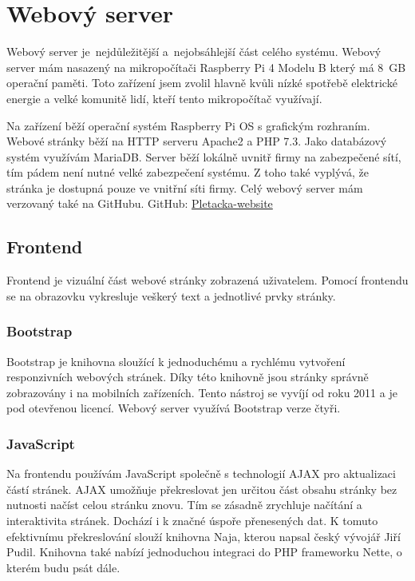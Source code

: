 \chapter{Webový server}
Webový server je~nejdůležitější a~nejobsáhlejší část celého systému. 
Webový server mám nasazený na mikropočítači Raspberry Pi 4 Modelu B který má 8~GB operační paměti.
Toto zařízení jsem zvolil hlavně kvůli nízké spotřebě elektrické energie a velké komunitě lidí, kteří tento mikropočítač využívají.

Na zařízení běží operační systém Raspberry Pi OS s grafickým rozhraním.
Webové stránky běží na HTTP serveru Apache2 a PHP 7.3.
Jako databázový systém využívám MariaDB.
Server běží lokálně uvnitř firmy na zabezpečené sítí, tím pádem není nutné velké zabezpečení systému.
\fxnote[author=JA]{\textcolor{mygreen}{Zabezpečení jinak přepsat}}
Z toho také vyplývá, že stránka je dostupná pouze ve vnitřní síti firmy.  
Celý webový server mám verzovaný také na GitHubu.\newline
GitHub: \href{https://github.com/Pletacka-IoT/Pletacka-website}{Pletacka-website}\cite{PL_WEB}

\section{Frontend}
 
Frontend je vizuální část webové stránky zobrazená uživatelem.
Pomocí frontendu se na obrazovku vykresluje veškerý text a jednotlivé prvky stránky.

\subsection{Bootstrap}
Bootstrap je knihovna sloužící k jednoduchému a rychlému vytvoření responzivních webových stránek.
Díky této knihovně jsou stránky správně zobrazovány i na mobilních zařízeních.
Tento nástroj se vyvíjí od roku 2011 a je pod otevřenou licencí.
Webový server využívá Bootstrap verze čtyři.


\subsection{JavaScript}
Na frontendu používám JavaScript společně s technologií AJAX pro aktualizaci částí stránek. AJAX umožňuje překreslovat jen určitou část obsahu stránky bez nutnosti načíst celou stránku znovu.
Tím se zásadně zrychluje načítání a interaktivita stránek. Dochází i k značné úspoře přenesených dat.
K tomuto efektivnímu překreslování slouží knihovna Naja\cite{NAJA}, kterou napsal český vývojář Jiří Pudil.
Knihovna také nabízí jednoduchou integraci do PHP frameworku Nette, o kterém budu psát dále.   



